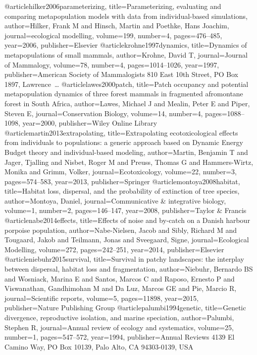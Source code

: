 @article{hilker2006parameterizing,
	title={Parameterizing, evaluating and comparing metapopulation models with data from individual-based simulations},
	author={Hilker, Frank M and Hinsch, Martin and Poethke, Hans Joachim},
	journal={ecological modelling},
	volume={199},
	number={4},
	pages={476--485},
	year={2006},
	publisher={Elsevier}
}
@article{krohne1997dynamics,
	title={Dynamics of metapopulations of small mammals},
	author={Krohne, David T},
	journal={Journal of Mammalogy},
	volume={78},
	number={4},
	pages={1014--1026},
	year={1997},
	publisher={American Society of Mammalogists 810 East 10th Street, PO Box 1897, Lawrence~…}
}
@article{lawes2000patch,
	title={Patch occupancy and potential metapopulation dynamics of three forest mammals in fragmented afromontane forest in South Africa},
	author={Lawes, Michael J and Mealin, Peter E and Piper, Steven E},
	journal={Conservation Biology},
	volume={14},
	number={4},
	pages={1088--1098},
	year={2000},
	publisher={Wiley Online Library}
}
@article{martin2013extrapolating,
	title={Extrapolating ecotoxicological effects from individuals to populations: a generic approach based on Dynamic Energy Budget theory and individual-based modeling},
	author={Martin, Benjamin T and Jager, Tjalling and Nisbet, Roger M and Preuss, Thomas G and Hammers-Wirtz, Monika and Grimm, Volker},
	journal={Ecotoxicology},
	volume={22},
	number={3},
	pages={574--583},
	year={2013},
	publisher={Springer}
}
@article{montoya2008habitat,
	title={Habitat loss, dispersal, and the probability of extinction of tree species},
	author={Montoya, Daniel},
	journal={Communicative \& integrative biology},
	volume={1},
	number={2},
	pages={146--147},
	year={2008},
	publisher={Taylor \& Francis}
}
@article{nabe2014effects,
	title={Effects of noise and by-catch on a Danish harbour porpoise population},
	author={Nabe-Nielsen, Jacob and Sibly, Richard M and Tougaard, Jakob and Teilmann, Jonas and Sveegaard, Signe},
	journal={Ecological Modelling},
	volume={272},
	pages={242--251},
	year={2014},
	publisher={Elsevier}
}
@article{niebuhr2015survival,
	title={Survival in patchy landscapes: the interplay between dispersal, habitat loss and fragmentation},
	author={Niebuhr, Bernardo BS and Wosniack, Marina E and Santos, Marcos C and Raposo, Ernesto P and Viswanathan, Gandhimohan M and Da Luz, Marcos GE and Pie, Marcio R},
	journal={Scientific reports},
	volume={5},
	pages={11898},
	year={2015},
	publisher={Nature Publishing Group}
}
@article{palumbi1994genetic,
	title={Genetic divergence, reproductive isolation, and marine speciation},
	author={Palumbi, Stephen R},
	journal={Annual review of ecology and systematics},
	volume={25},
	number={1},
	pages={547--572},
	year={1994},
	publisher={Annual Reviews 4139 El Camino Way, PO Box 10139, Palo Alto, CA 94303-0139, USA}
}
